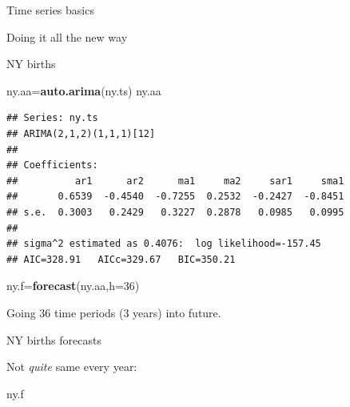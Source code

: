 \documentclass[ignorenonframetext,]{beamer}
\newenvironment{Shaded}{\begin{snugshade}}{\end{snugshade}}
\newcommand{\DataTypeTok}[1]{\textcolor[rgb]{0.13,0.29,0.53}{#1}}
\newcommand{\DecValTok}[1]{\textcolor[rgb]{0.00,0.00,0.81}{#1}}
\newcommand{\KeywordTok}[1]{\textcolor[rgb]{0.13,0.29,0.53}{\textbf{#1}}}
\newcommand{\NormalTok}[1]{#1}
\begin{document}
\begin{frame}[fragile]{Time series basics}
\begin{block}{Doing it all the new way}
\begin{block}{NY births}
\begin{Shaded}
\begin{Highlighting}[]
\NormalTok{ny.aa=}\KeywordTok{auto.arima}\NormalTok{(ny.ts)}
\NormalTok{ny.aa}
\end{Highlighting}
\end{Shaded}

\begin{verbatim}
## Series: ny.ts 
## ARIMA(2,1,2)(1,1,1)[12] 
## 
## Coefficients:
##          ar1      ar2      ma1     ma2     sar1     sma1
##       0.6539  -0.4540  -0.7255  0.2532  -0.2427  -0.8451
## s.e.  0.3003   0.2429   0.3227  0.2878   0.0985   0.0995
## 
## sigma^2 estimated as 0.4076:  log likelihood=-157.45
## AIC=328.91   AICc=329.67   BIC=350.21
\end{verbatim}

\begin{Shaded}
\begin{Highlighting}[]
\NormalTok{ny.f=}\KeywordTok{forecast}\NormalTok{(ny.aa,}\DataTypeTok{h=}\DecValTok{36}\NormalTok{)}
\end{Highlighting}
\end{Shaded}

Going 36 time periods (3 years) into future.

NY births forecasts

Not \emph{quite} same every year:

\begin{Shaded}
\begin{Highlighting}[]
\NormalTok{ny.f}
\end{Highlighting}
\end{Shaded}


\end{block}
\end{block}
\end{frame}
\end{document}

